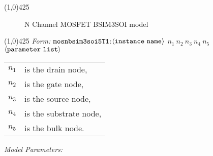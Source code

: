 \documentclass{article}
\begin{document}
\hrulefill\linethickness{0.5mm}\line(1,0){425} \normalsize
\newline
\begin{figure}[h]
\centerline{\epsfxsize=4in} \caption{N Channel MOSFET
BSIM3SOI model}
\end{figure}
\newline
\linethickness{0.5mm} \line(1,0){425}
\newline
\textit{Form:}
$\tt mosnbsim3soi5T1$:$\langle \tt{instance\ name}\rangle$ $n_1\
n_2\ n_3\ n_4\ n_5\ $ $\langle \tt{parameter\ list}\rangle$
\newline
\begin{tabular}{r l}
$n_1$ & is the drain node, \\
$n_2$ & is the gate node, \\
$n_3$ & is the source node, \\
$n_4$ & is the substrate node, \\
$n_5$ & is the bulk node. \\
\end{tabular}
\newpage
\noindent\textit{Model Parameters:}
\newline
\end{document}
